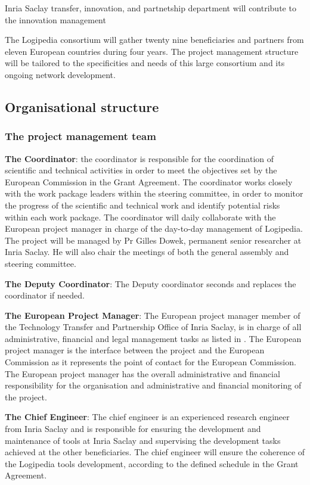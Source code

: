 {\color{red} Inria Saclay transfer, innovation, and partnetship
  department will contribute to the innovation management}

The Logipedia consortium will gather twenty nine beneficiaries and partners
from eleven European countries during four years. The project management
structure will be tailored to the specificities and needs of this
large consortium and its ongoing network development.

\subsection{Organisational structure}

\subsubsection*{The project management team}

\begin{compactitem}
\item{\bf The Coordinator}: the 
coordinator is responsible for the coordination of
scientific and technical activities in order to meet the objectives
set by the European Commission in the Grant Agreement. The 
coordinator works closely with the work package leaders
within the steering committee, in order to monitor the progress of the
scientific and technical work and identify potential risks within each
work package. The coordinator will daily
collaborate with the European project manager in charge of the
day-to-day management of Logipedia. The project will be managed by Pr
Gilles Dowek, permanent senior researcher at Inria Saclay. He will
also chair the meetings of both the general assembly and steering
committee.

\item{\bf The Deputy Coordinator}: The Deputy coordinator seconds and
replaces the coordinator if needed.

\item{\bf The European Project Manager}: The European project manager
member of the Technology Transfer and Partnership Office of Inria
Saclay, is in charge of all administrative, financial and legal
management tasks as listed in . The
European project manager is the interface between the project and the
European Commission as it represents the point of contact for the
European Commission. The European project manager has the overall
administrative and financial responsibility for the organisation and
administrative and financial monitoring of the project.

\item{\bf The Chief Engineer}: The chief engineer is an experienced
research engineer from Inria Saclay and is responsible for ensuring
the development and maintenance of tools at Inria Saclay and
supervising the development tasks achieved at the other
beneficiaries. The chief engineer will ensure the coherence of the
Logipedia tools development, according to the defined schedule in the
Grant Agreement.
\end{compactitem}

